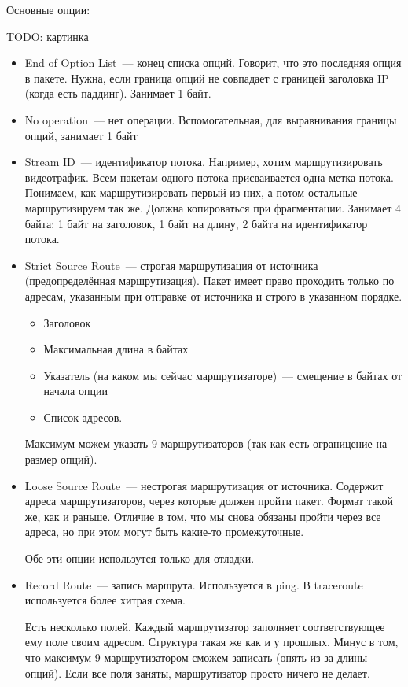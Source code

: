 Основные опции:

TODO: картинка
\begin{itemize}
    \item End of Option List~--- конец списка опций. Говорит, что это последняя опция в пакете. Нужна, если граница опций не совпадает с границей заголовка IP (когда есть паддинг). Занимает 1 байт.
    \item No operation~--- нет операции. Вспомогательная, для выравнивания границы опций, занимает 1 байт
    \item Stream ID~--- идентификатор потока. Например, хотим маршрутизировать видеотрафик. Всем пакетам одного потока присваивается одна метка потока. Понимаем, как маршрутизировать первый из них, а потом остальные маршрутизируем так же. Должна копироваться при фрагментации. Занимает 4 байта: 1 байт на заголовок, 1 байт на длину, 2 байта на идентификатор потока.
    \item Strict Source Route~--- строгая маршрутизация от источника (предопределённая маршрутизация). Пакет имеет право проходить только по адресам, указанным при отправке от источника и строго в указанном порядке.
    \begin{itemize}
        \item Заголовок
        \item Максимальная длина в байтах
        \item Указатель (на каком мы сейчас маршрутизаторе)~--- смещение в байтах от начала опции
        \item Список адресов.
    \end{itemize}
    Максимум можем указать 9 маршрутизаторов (так как есть ограницение на размер опций).
    \item Loose Source Route~--- нестрогая маршрутизация от источника. Содержит адреса маршрутизаторов, через которые должен пройти пакет. Формат такой же, как и раньше. Отличие в том, что мы снова обязаны пройти через все адреса, но при этом могут быть какие-то промежуточные.

    Обе эти опции использутся только для отладки.

    \item Record Route~--- запись маршрута. Используется в ping. В traceroute используется более хитрая схема.

    Есть несколько полей. Каждый маршрутизатор заполняет соответствующее ему поле своим адресом. Структура такая же как и у прошлых. Минус в том, что максимум 9 маршрутизатором сможем записать (опять из-за длины опций). Если все поля заняты, маршрутизатор просто ничего не делает.
\end{itemize}

